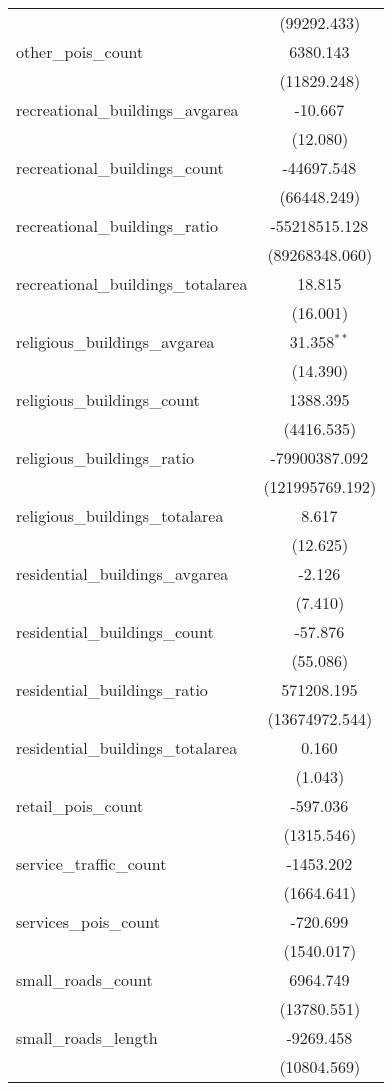\begin{table}[!htbp]
\begin{tabular}{@{\extracolsep{5pt}}lc}
  & (99292.433) \\
 other_pois_count & 6380.143$^{}$ \\
  & (11829.248) \\
 recreational_buildings_avgarea & -10.667$^{}$ \\
  & (12.080) \\
 recreational_buildings_count & -44697.548$^{}$ \\
  & (66448.249) \\
 recreational_buildings_ratio & -55218515.128$^{}$ \\
  & (89268348.060) \\
 recreational_buildings_totalarea & 18.815$^{}$ \\
  & (16.001) \\
 religious_buildings_avgarea & 31.358$^{**}$ \\
  & (14.390) \\
 religious_buildings_count & 1388.395$^{}$ \\
  & (4416.535) \\
 religious_buildings_ratio & -79900387.092$^{}$ \\
  & (121995769.192) \\
 religious_buildings_totalarea & 8.617$^{}$ \\
  & (12.625) \\
 residential_buildings_avgarea & -2.126$^{}$ \\
  & (7.410) \\
 residential_buildings_count & -57.876$^{}$ \\
  & (55.086) \\
 residential_buildings_ratio & 571208.195$^{}$ \\
  & (13674972.544) \\
 residential_buildings_totalarea & 0.160$^{}$ \\
  & (1.043) \\
 retail_pois_count & -597.036$^{}$ \\
  & (1315.546) \\
 service_traffic_count & -1453.202$^{}$ \\
  & (1664.641) \\
 services_pois_count & -720.699$^{}$ \\
  & (1540.017) \\
 small_roads_count & 6964.749$^{}$ \\
  & (13780.551) \\
 small_roads_length & -9269.458$^{}$ \\
  & (10804.569) \\

\end{tabular}
\end{table}
